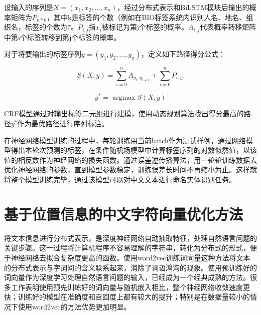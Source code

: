 \documentclass[winfonts,master,oneside,nobackinfo]{njuthesis}
\begin{document}
设输入的序列是$X=\left(x_{1}, x_{2}, \ldots, x_{n}\right)$，经过分布式表示和BiLSTM模块后输出的概率矩阵为$P_{n * k}$，其中k是标签的个数（例如在BIO标签系统内识别人名、地名、组织名，标签的个数为7。$P_{i, j}$指$x_{i}$被标记为第j个标签的概率。$A_{i, j}$代表概率转移矩阵中第i个标签转移到第j个标签的概率。

对于将要输出的标签序列$y=\left(y_{1}, y_{2}, \ldots, y_{n}\right)$，定义如下路径得分公式：

\begin{equation}
S(X, y)=\sum_{i=0}^{n} A_{y_{i}, y_{i+1}}+\sum_{i=0}^{n} P_{i, y_{i}} 
\end{equation}

\begin{equation}
y^{*}=\operatorname{argmax} S(X, y)
\end{equation}

CRF模型通过对输出标签二元组进行建模，使用动态规划算法找出得分最高的路径$y^{*}$作为最优路径进行序列标注。

在神经网络模型训练的过程中，每轮训练用当前batch作为测试样例，通过网络模型得出本轮次预测的标签，在条件随机场模型中计算标签序列的对数似然值，以该值的相反数作为神经网络的损失函数。通过误差逆传播算法，用一轮轮训练数据去优化神经网络的参数，直到模型参数稳定，训练误差长时间不再缩小为止。这样就将整个模型训练完毕，通过该模型可以对中文文本进行命名实体识别任务。



\section{基于位置信息的中文字符向量优化方法}

将文本信息进行分布式表示，是深度神经网络自动抽取特征，处理自然语言问题的关键步骤。这一过程将计算机程序不容易理解的字符串，转化为分布式的形式，便于神经网络去拟合复杂度更高的函数。使用word2vec训练词向量这种方法将文本的分布式表示与字词间的含义联系起来，消除了词语鸿沟的现象。使用预训练好的词向量作为深度学习处理自然语言问题的输入，已经成为一个经典成熟的方法。很多工作表明\cite{Yoon}使用预先训练好的词向量与随机嵌入相比，整个神经网络收敛速度更快；训练好的模型在准确度和召回度上都有较大的提升；特别是在数据量较小的情况下使用word2vec的方法优势更加明显。
\end{document}
